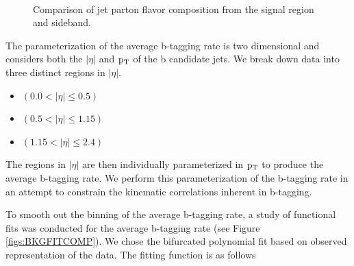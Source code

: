 \begin{figure}[htbp]
\begin{center}
\\ 
\caption{
Comparison of jet parton flavor composition from the signal region and sideband.
}
\label{figs:partonflav}
\end{center}
\end{figure}

The parameterization of the average b-tagging rate is two dimensional and considers both the $|\eta|$ and $\mathrm{p_{T}}$ of the b candidate jets.  
We break down data into three distinct regions in $|\eta|$. 


\begin{itemize}
	\item {} $(0.0 < |\eta| \leq 0.5)$
	\item {} $(0.5 < |\eta| \leq 1.15)$ 
	\item {} $(1.15 < |\eta| \leq 2.4)$ 
\end{itemize}

The regions in $|\eta|$ are then individually parameterized in $\mathrm{p_{T}}$ to produce the average b-tagging rate.  We perform this parameterization 
of the b-tagging rate in an attempt to constrain the kinematic correlations inherent in b-tagging.

To smooth out the binning of the average b-tagging rate, a study of functional fits was conducted for the average b-tagging rate (see Figure \ref{figs:BKGFITCOMP}).
We chose the bifurcated polynomial fit based on observed representation of the data.  The fitting function is as follows

